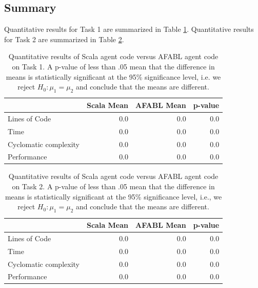 \subsection{Summary}

Quantitative results for Task 1 are summarized in Table \ref{tbl:task1-results}. Quantitative results for Task 2 are summarized in Table \ref{tbl:task2-results}.

\begin{center}
\begin{table}[h]
\begin{tabular}{|l|r|r|r|}\hline
                      & Scala Mean & AFABL Mean & p-value \\\hline
Lines of Code         & 0.0        & 0.0        & 0.0 \\
Time                  & 0.0        & 0.0        & 0.0 \\
Cyclomatic complexity & 0.0        & 0.0        & 0.0 \\
Performance           & 0.0        & 0.0        & 0.0 \\\hline
\end{tabular}
\caption{Quantitative results of Scala agent code versus AFABL agent code on Task 1. A p-value of less than .05 mean that the difference in means is statistically significant at the 95\% significance level, i.e. we reject $H_0: \mu_1 = \mu_2$ and conclude that the means are different.}
\label{tbl:task1-results}
\end{table}
\end{center}

\begin{center}
\begin{table}[h]
\begin{tabular}{|l|r|r|r|}\hline
                      & Scala Mean & AFABL Mean & p-value \\\hline
Lines of Code         & 0.0        & 0.0        & 0.0 \\
Time                  & 0.0        & 0.0        & 0.0 \\
Cyclomatic complexity & 0.0        & 0.0        & 0.0 \\
Performance           & 0.0        & 0.0        & 0.0 \\\hline
\end{tabular}
\caption{Quantitative results of Scala agent code versus AFABL agent code on Task 2. A p-value of less than .05 mean that the difference in means is statistically significant at the 95\% significance level, i.e., we reject $H_0: \mu_1 = \mu_2$ and conclude that the means are different.}
\label{tbl:task2-results}
\end{table}
\end{center}


